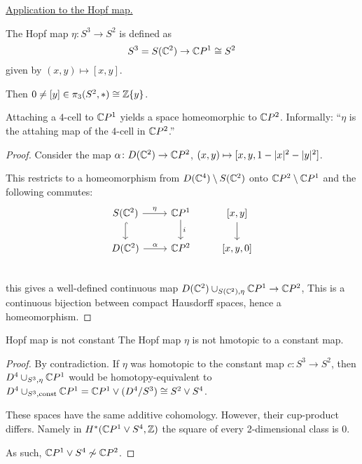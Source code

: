 \documentclass[language=english]{TemplateLecture}
\begin{document}
\underline{Application to the Hopf map.}

The Hopf map \(\eta \colon S^3 \to S^2\) is defined as
\[S^3 = S(\mathbb{C}^2) \to \mathbb{C} P^1 \cong S^2\]
given by \((x,y) \mapsto [x,y]\).

Then \(0 \neq [y] \in \pi_3(S^2, *) \cong \mathbb{Z}\{y\}\).

\begin{proposition}
    Attaching a \(4\)-cell to \(\mathbb{C} P^1\) yields a space homeomorphic to \(\mathbb{C} P ^2\). Informally: \enquote{\(\eta\) is the attahing map of the \(4\)-cell in \(\mathbb{C} P^2\).}
\end{proposition}

\begin{proof}
    Consider the map \(\alpha\colon D(\mathbb{C}^2) \to \mathbb{C} P^2\), \((x,y) \mapsto [x,y, 1- \lvert x\rvert ^2 - \lvert y\rvert^2]\).

    This restricts to a homeomorphism from \(D(\mathbb{C}^4) \setminus S(\mathbb{C}^2)\) onto \(\mathbb{C} P^2 \setminus \mathbb{C} P^1\) and the following commutes:
    \[\begin{tikzcd}
        S(\IC^2) \ar[d, hook] \ar[r, "\eta"] & \IC P^1 \ar[d, "i"] & {[x,y]} \ar[d]\\
        D(\IC^2) \ar[r, "\alpha"] & \IC P^2 & {[x,y,0] }\\
    \end{tikzcd}\]
    this gives a well-defined continuous map \(D(\mathbb{C}^2) \cup_{S(\mathbb{C}^2), \eta} \mathbb{C} P^1 \to \mathbb{C} P^2\), This is a continuous bijection between compact Hausdorff spaces, hence a homeomorphism.
\end{proof}

\begin{thm}{Hopf map is not constant}{}
    The Hopf map \(\eta\) is not hmotopic to a constant map.
\end{thm}

\begin{proof}
    By contradiction. If \(\eta\) was homotopic to the constant map \(c\colon S^3 \to S^2\), then \(D^4 \cup_{S^3, \eta} \mathbb{C} P^1 \) would be homotopy-equivalent to \(D^4 \cup_{S^3, \text{const}} \mathbb{C} P^1 = \mathbb{C} P^1 \vee (D^4/S^3)  \cong S^2 \vee S^4\).

    These spaces have the same additive cohomology. However, their cup-product differs. Namely in \(H^*(\mathbb{C} P^1 \vee S^4, \mathbb{Z})\) the square of every 2-dimensional class is \(0\).

    As such,
    \(\mathbb{C} P^1 \vee S^4 \not\sim \mathbb{C} P^2\).
\end{proof}
\end{document}
